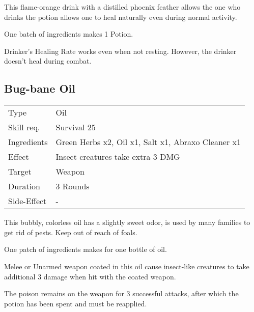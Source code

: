 \documentclass[11pt,a4paper,twocolumn]{book}
\begin{document}
\medskip

This flame-orange drink with a distilled phoenix feather allows the one who drinks the potion allows one to heal naturally even during normal activity.

One batch of ingredients makes 1 Potion.

Drinker's Healing Rate works even when not resting. However, the drinker doesn't heal during combat.

\vfill

\subsection*{Bug-bane Oil}
{
	\begin{tabu} to 75mm{| X[l,4] | X[l,8] |}
		\hline
		Type 			& Oil 														\\
		Skill req.	    & Survival 25 												\\
		Ingredients     & Green Herbs x2, Oil x1, Salt x1, Abraxo Cleaner x1		\\
		Effect     		& Insect creatures take extra 3 DMG				\\
		Target      	& Weapon													\\
		Duration  		& 3 Rounds	 												\\
		Side-Effect     & -															\\ \hline
	\end{tabu}
	
}

\medskip

This bubbly, colorless oil has a slightly sweet odor, is used by many families to get rid of pests. Keep out of reach of foals.

One patch of ingredients makes for one bottle of oil.

Melee or Unarmed weapon coated in this oil cause insect-like creatures to take additional 3 damage when hit with the coated weapon.

The poison remains on the weapon for 3 successful attacks, after which the potion has been spent and must be reapplied.

\vfill
\end{document}
